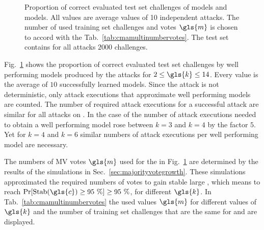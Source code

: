 \begin{figure}[ht]
	\fi
\fi
\caption[Proportion of correct evaluated test set challenges for \acs{XOR} Arbiter \puf models and Majority \acs{XOR} Arbiter \puf models]{Proportion of correct evaluated test set challenges of \xpuf models and \mxpuf models. All values are average values of 10 independent attacks. The number of used training set challenges and votes $\gls{m}$ is chosen to accord with the Tab.\ \ref{tab:cmamultinumbervotes}. The test set contains for all attacks $2000$ challenges.}
\label{fig:cmamultiattackmodelperformance}
\end{figure}

Fig.\ \ref{fig:cmamultiattackmodelperformance} shows the proportion of correct evaluated test set challenges by well performing models produced by the attacks for $2 \le \gls{k} \le 14$.
Every value is the average of $10$ successfully learned models.
Since the attack is not deterministic, only attack executions that approximate well performing models are counted.
The number of required attack executions for a successful attack are similar for all attacks on \xpufs.
In the case of \mxpufs the number of attack executions needed to obtain a well performing model rose between $k = 3$ and $k = 4$ by the factor $5$.
Yet for $k = 4$ and $k = 6$ similar numbers of attack executions per well performing model are necessary.

The numbers of \ac{MV} votes $\gls{m}$ used for the \mxpufs in Fig.\ \ref{fig:cmamultiattackmodelperformance} are determined by the results of the simulations in Sec.\ \ref{sec:majorityvotegrowth}.
These simulations approximated the required numbers of votes to gain stable large \mxpufs, which means to reach $\Pr[\protect\Stab(\gls{c}) \ge 95\ \%] \ge 95\ \%$, for different $\gls{k}$.
In Tab.\ \ref{tab:cmamultinumbervotes} the used values $\gls{m}$ for different values of $\gls{k}$ and the number of training set challenges that are the same for \xpufs and \mxpufs are displayed.

